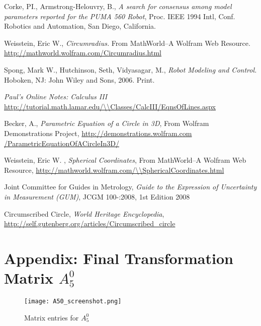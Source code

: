 \documentclass[12pt]{article}
\begin{document}
\pagebreak
\begin{thebibliography}{9}
	
    Corke, PI., Armstrong-Helouvry, B.,
    \textit{A search for consensus among model parameters reported for the PUMA 560 Robot},
    Proc. IEEE 1994 Intl, Conf. Robotics and Automation, San Diego, California.
    
  	Weisstein, Eric W.,
	\textit{Circumradius.}
	From MathWorld--A Wolfram Web Resource.
	\url{http://mathworld.wolfram.com/Circumradius.html}

    Spong, Mark W., Hutchinson, Seth, Vidyasagar, M.,
    \textit{Robot Modeling and Control.} 
    Hoboken, NJ: John Wiley and Sons, 2006. Print.
    
    
    \textit{Paul's Online Notes: Calculus III}
    \url{http://tutorial.math.lamar.edu/\\Classes/CalcIII/EqnsOfLines.aspx}
    
    Becker, A.,
	\textit{Parametric Equation of a Circle in 3D},
    From Wolfram Demonstrations Project, \url{http://demonstrations.wolfram.com   /ParametricEquationOfACircleIn3D/}

	Weisstein, Eric W. ,
    \textit{Spherical Coordinates},
    From MathWorld--A Wolfram Web Resource,
    \url{http://mathworld.wolfram.com/\\SphericalCoordinates.html} 
       
	Joint Committee for Guides in Metrology,
    \textit{Guide to the Expression of Uncertainty in Measurement (GUM)},
    JCGM 100-:2008, 1st Edition 2008 
    
    Circumscribed Circle,
    \textit{World Heritage Encyclopedia},
    \url{http://self.gutenberg.org/articles/Circumscribed\_circle}
    
\end{thebibliography}
\pagebreak
\section*{Appendix: Final Transformation Matrix $A_5^0$} 

\begin{figure}[!ht]
  {\texttt{[image: A50\_screenshot.png]}}
  \centering
  \caption{Matrix entries for $A_5^0$}
  \centering
  \label{fig:A50_matrix}
\end{figure}
\end{document}
